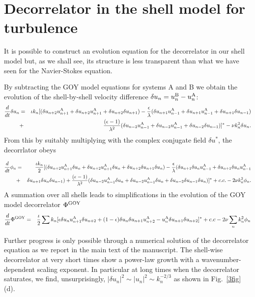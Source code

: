 \documentclass[amsmath,amssymb,amsbsy,pre,twocolumn,tightenlines,superscriptaddress,floatfix]{revtex4-2}
\begin{document}
\section{Decorrelator in the shell model for turbulence} \label{App_shell}
\renewcommand{\theequation}{C-\arabic{equation}}
\setcounter{equation}{0}
It is possible to construct an evolution equation for the decorrelator in our shell model but, as we shall see, its structure is
less transparent than what we have seen for the Navier-Stokes equation.

By subtracting the GOY model equations for systems A and B we obtain
the evolution of the shell-by-shell  velocity difference $\delta u_n = u_n^{\rm B} - u_n^{\rm A}$:
\begin{eqnarray}
    \frac{d}{dt} \delta u_n
    &=& \iota k_n [(\delta u_{n+2}u^{\rm A}_{n+1} + \delta u_{n+2}u^{\rm A}_{n+1} + \delta u_{n+2}\delta u_{n+1}) - \frac{\epsilon}{\lambda}(\delta u_{n+1}u^{\rm A}_{n-1} + \delta u_{n+1}u^{\rm A}_{n-1} + \delta u_{n+1}\delta u_{n-1})  \nonumber \\
    &+& \frac{(\epsilon - 1)}{\lambda^2} (\delta u_{n-2}u^{\rm A}_{n-1} + \delta u_{n-2}u^{\rm A}_{n-1} + \delta u_{n-2}\delta u_{n-1})]^* - \nu k_n^2 \delta u_n.
\label{shell_diff}
\end{eqnarray}
From this by suitably multiplying with the complex conjugate field $\delta u^*$, the decorrlator obeys

\begin{eqnarray}
\frac{d}{dt} \phi_n &=& \frac{\iota k_n}{2} [(\delta u_{n+2}u^{\rm A}_{n+1}\delta u_{n} + \delta u_{n+2}u^{\rm A}_{n+1}\delta u_{n} + \delta u_{n+2}\delta u_{n+1}\delta u_{n}) - \frac{\epsilon}{\lambda}(\delta u_{n+1}\delta u_{n}u^{\rm A}_{n-1} + \delta u_{n+1}\delta u_{n}u^{\rm A}_{n-1} \nonumber\\
&+& \delta u_{n+1}\delta u_{n}\delta u_{n-1}) + \frac{(\epsilon - 1)}{\lambda^2} (\delta u_{n-2}u^{\rm A}_{n-1}\delta u_{n} + \delta u_{n-2}u^{\rm A}_{n-1}\delta u_{n} + \delta u_{n-2}\delta u_{n-1}\delta u_{n})]^* + c.c. - 2\nu k_n^2 \phi_n.
\label{shell_phi}
\end{eqnarray}
A summation over all shells leads to simplifications in the evolution of the GOY model decorrelator $\Phi^{\rm GOY}$
\begin{eqnarray}
	\frac{d}{dt}\Phi^{\rm GOY} &=& \frac{\iota}{2} \sum k_n [\epsilon\delta u_{n} u^{\rm A}_{n+1}\delta u _{n+2} + (1-\epsilon)\delta u_{n} \delta u_{n+1}u^{\rm A} _{n+2} - u^{\rm A}_{n} \delta u_{n+1}\delta u _{n+2}]^* + c.c - 2\nu \sum_n k_n^2 \phi_n
\end{eqnarray}

Further progress is only possible through a numerical solution of the
decorrelator equation as we report in the main text of the manuscript. The
shell-wise decorrelator at very short times show a power-law growth with a
wavenumber-dependent scaling exponent.  In particular at long times when the
decorrelator saturates, we find, unsurprisingly, $|\delta u_n|^2 \sim |u_n|^2
\sim k_n^{-2/3}$ as shown in Fig.~\ref{3fig}(d).
\end{document}
